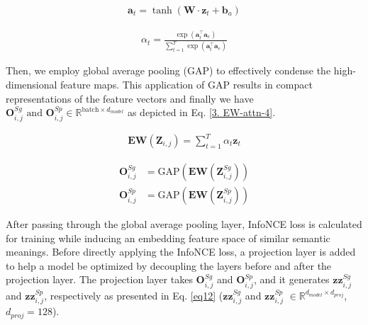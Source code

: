 \vspace{-10pt}
\begin{align}
\label{3. EW-attn-1}
\mathbf{a}_t = \tanh(\mathbf{W} \cdot \mathbf{z}_t + \mathbf{b}_a) 
\end{align}
\vspace{-27pt}

\begin{align}
\label{3. EW-attn-2}
\alpha_t = \frac{\exp(\mathbf{a}_t^ \top \mathbf{a}_e)}{\sum_{t=1}^{T} \exp(\mathbf{a}_t^ \top \mathbf{a}_e)}
\end{align}

Then, we employ global average pooling (GAP) to effectively condense the high-dimensional feature maps. This application of GAP results in compact representations of the feature vectors and finally we have $\textbf{O}^{Sg}_{i, j} \text{ and } \textbf{O}^{Sp}_{i, j} \in \mathbb{R}^{\text{batch} \times d_{model}}$ as depicted in Eq. \ref{3. EW-attn-4}.

\vspace{-15pt}
\begin{align}
\label{3. EW-attn-3}
\textbf{EW}(\mathbf{Z}_{i, j}) = \sum_{t=1}^{T} \alpha_{t} \mathbf{z}_t 
\end{align}
\vspace{-15pt}

\begin{align}
\label{3. EW-attn-4}
\textbf{O}^{Sg}_{i, j} &= \text{GAP}(\textbf{EW}(\textbf{Z}^{Sg}_{i, j})) \nonumber \\ 
\textbf{O}^{Sp}_{i, j} &= \text{GAP}(\textbf{EW}(\textbf{Z}^{Sp}_{i, j}))
\end{align}

After passing through the global average pooling layer,  InfoNCE loss is calculated for training while inducing an embedding feature space of similar semantic meanings. Before directly applying the InfoNCE loss, a projection layer is added to help a model be optimized by decoupling the layers before and after the projection layer.
%
The projection layer takes $\mathbf{O}^{Sg}_{i, j}$ and $\mathbf{O}^{Sp}_{i, j}$, and it generates $\mathbf{zz}^{Sg}_{i,j}$ and $\mathbf{zz}^{Sp}_{i,j}$, respectively as presented in Eq. \ref{eq12} 
%
($\mathbf{zz}^{Sg}_{i,j}$ and $\mathbf{zz}^{Sp}_{i,j}$ $\in \mathbb{R}^{d_{model} \times d_{proj}}$, $d_{proj} = 128$).
%

